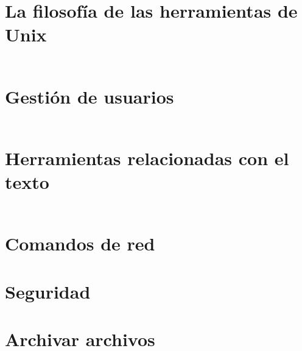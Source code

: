 
\section{La filosofía de las herramientas de Unix}

\begin{frame}[c]{}
\end{frame}

\begin{frame}[fragile]
  \frametitle{}

  \begin{lstlisting}[language=Bash]
  \end{lstlisting}
\end{frame}

\section{Gestión de usuarios}

\begin{frame}[c]{}
\end{frame}

\begin{frame}[fragile]
  \frametitle{}

  \begin{lstlisting}[language=Bash]
  \end{lstlisting}
\end{frame}

\section{Herramientas relacionadas con el texto}

\begin{frame}[c]{}
\end{frame}

\begin{frame}[fragile]
  \frametitle{}

  \begin{lstlisting}[language=Bash]
  \end{lstlisting}
\end{frame}

\section{Comandos de red}
\section{Seguridad}
\section{Archivar archivos}

